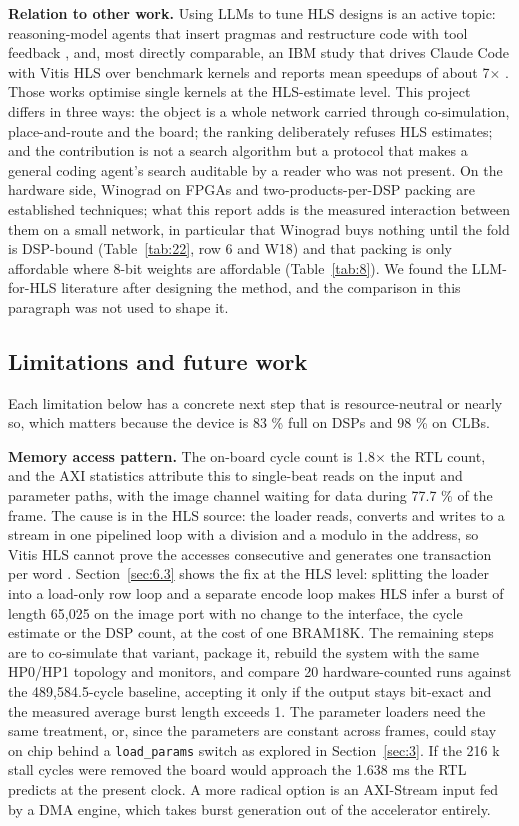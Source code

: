\textbf{Relation to other work.} Using LLMs to tune HLS designs is an active topic: reasoning-model agents that insert pragmas and restructure code with tool feedback \cite{ref21}, and, most directly comparable, an IBM study that drives Claude Code with Vitis HLS over benchmark kernels and reports mean speedups of about 7$\times$ \cite{ref22}. Those works optimise single kernels at the HLS-estimate level. This project differs in three ways: the object is a whole network carried through co-simulation, place-and-route and the board; the ranking deliberately refuses HLS estimates; and the contribution is not a search algorithm but a protocol that makes a general coding agent's search auditable by a reader who was not present. On the hardware side, Winograd on FPGAs \cite{ref18} and two-products-per-DSP packing are established techniques; what this report adds is the measured interaction between them on a small network, in particular that Winograd buys nothing until the fold is DSP-bound (Table~\ref{tab:22}, row 6 and W18) and that packing is only affordable where 8-bit weights are affordable (Table~\ref{tab:8}). We found the LLM-for-HLS literature after designing the method, and the comparison in this paragraph was not used to shape it.

\subsection{Limitations and future work}\label{sec:6.5}

Each limitation below has a concrete next step that is resource-neutral or nearly so, which matters because the device is 83 \% full on DSPs and 98 \% on CLBs.

\textbf{Memory access pattern.} The on-board cycle count is 1.8$\times$ the RTL count, and the AXI statistics attribute this to single-beat reads on the input and parameter paths, with the image channel waiting for data during 77.7 \% of the frame. The cause is in the HLS source: the loader reads, converts and writes to a stream in one pipelined loop with a division and a modulo in the address, so Vitis HLS cannot prove the accesses consecutive and generates one transaction per word \cite{ref12}. Section~\ref{sec:6.3} shows the fix at the HLS level: splitting the loader into a load-only row loop and a separate encode loop makes HLS infer a burst of length 65,025 on the image port with no change to the interface, the cycle estimate or the DSP count, at the cost of one BRAM18K. The remaining steps are to co-simulate that variant, package it, rebuild the system with the same HP0/HP1 topology and monitors, and compare 20 hardware-counted runs against the 489,584.5-cycle baseline, accepting it only if the output stays bit-exact and the measured average burst length exceeds 1. The parameter loaders need the same treatment, or, since the parameters are constant across frames, could stay on chip behind a \texttt{load\_params} switch as explored in Section~\ref{sec:3}. If the 216 k stall cycles were removed the board would approach the 1.638 ms the RTL predicts at the present clock. A more radical option is an AXI-Stream input fed by a DMA engine, which takes burst generation out of the accelerator entirely.

